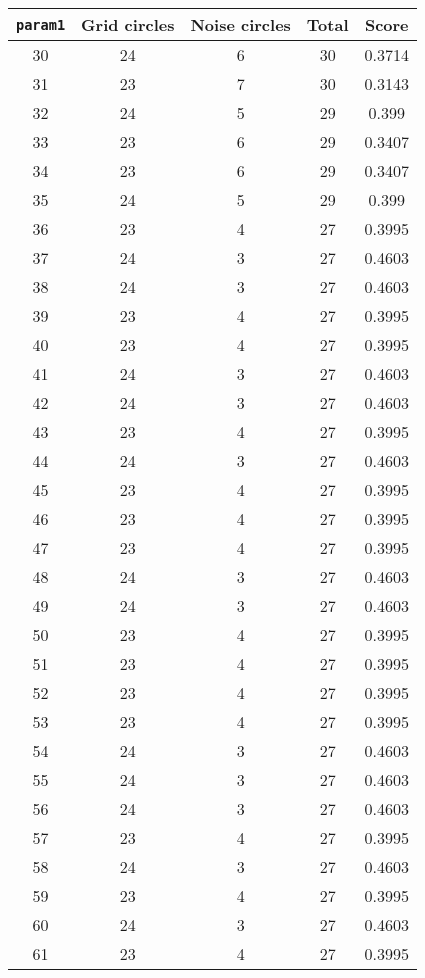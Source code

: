 \documentclass[letterpaper, 12pt]{article}
\begin{document}
\begin{longtable}{|c|c|c|c|c|}
\hline
\textbf{\texttt{param1}} & \textbf{Grid circles} & \textbf{Noise circles} & \textbf{Total} & \textbf{Score} \\
\hline
30 & 24 & 6 & 30 & 0.3714 \\
\hline
31 & 23 & 7 & 30 & 0.3143 \\
\hline
32 & 24 & 5 & 29 & 0.399 \\
\hline
33 & 23 & 6 & 29 & 0.3407 \\
\hline
34 & 23 & 6 & 29 & 0.3407 \\
\hline
35 & 24 & 5 & 29 & 0.399 \\
\hline
36 & 23 & 4 & 27 & 0.3995 \\
\hline
37 & 24 & 3 & 27 & 0.4603 \\
\hline
38 & 24 & 3 & 27 & 0.4603 \\
\hline
39 & 23 & 4 & 27 & 0.3995 \\
\hline
40 & 23 & 4 & 27 & 0.3995 \\
\hline
41 & 24 & 3 & 27 & 0.4603 \\
\hline
42 & 24 & 3 & 27 & 0.4603 \\
\hline
43 & 23 & 4 & 27 & 0.3995 \\
\hline
44 & 24 & 3 & 27 & 0.4603 \\
\hline
45 & 23 & 4 & 27 & 0.3995 \\
\hline
46 & 23 & 4 & 27 & 0.3995 \\
\hline
47 & 23 & 4 & 27 & 0.3995 \\
\hline
48 & 24 & 3 & 27 & 0.4603 \\
\hline
49 & 24 & 3 & 27 & 0.4603 \\
\hline
50 & 23 & 4 & 27 & 0.3995 \\
\hline
51 & 23 & 4 & 27 & 0.3995 \\
\hline
52 & 23 & 4 & 27 & 0.3995 \\
\hline
53 & 23 & 4 & 27 & 0.3995 \\
\hline
54 & 24 & 3 & 27 & 0.4603 \\
\hline
55 & 24 & 3 & 27 & 0.4603 \\
\hline
56 & 24 & 3 & 27 & 0.4603 \\
\hline
57 & 23 & 4 & 27 & 0.3995 \\
\hline
58 & 24 & 3 & 27 & 0.4603 \\
\hline
59 & 23 & 4 & 27 & 0.3995 \\
\hline
60 & 24 & 3 & 27 & 0.4603 \\
\hline
61 & 23 & 4 & 27 & 0.3995 \\

\end{longtable}
\end{document}
